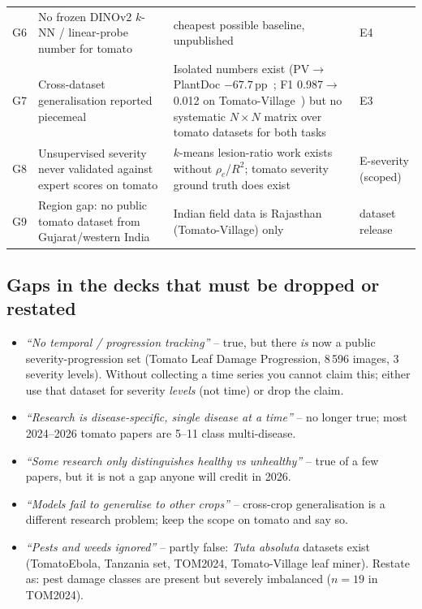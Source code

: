 \begin{longtable}{@{}L{0.6cm}L{4.7cm}L{6.4cm}L{4.2cm}@{}}
G6 & No frozen DINOv2 $k$-NN / linear-probe number for tomato & cheapest possible baseline, unpublished & E4 \\
G7 & Cross-dataset generalisation reported piecemeal & Isolated numbers exist (PV$\to$PlantDoc $-67.7$\,pp~\cite{fpls2026gap}; F1 0.987$\to$0.012 on Tomato-Village~\cite{biorxiv2024}) but no systematic $N\times N$ matrix over tomato datasets for both tasks & E3 \\
G8 & Unsupervised severity never validated against expert scores on tomato & $k$-means lesion-ratio work exists~\cite{charak2022} without $\rho_c$/$R^2$; tomato severity ground truth does exist~\cite{sad2015} & E-severity (scoped) \\
G9 & Region gap: no public tomato dataset from Gujarat/western India & Indian field data is Rajasthan (Tomato-Village) only & dataset release \\
\end{longtable}

\subsection{Gaps in the decks that must be dropped or restated}
\begin{itemize}
  \item \emph{``No temporal / progression tracking''} -- true, but there \emph{is} now a public severity-progression set (Tomato Leaf Damage Progression, 8\,596 images, 3 severity levels). Without collecting a time series you cannot claim this; either use that dataset for severity \emph{levels} (not time) or drop the claim.
  \item \emph{``Research is disease-specific, single disease at a time''} -- no longer true; most 2024--2026 tomato papers are 5--11 class multi-disease.
  \item \emph{``Some research only distinguishes healthy vs unhealthy''} -- true of a few papers, but it is not a gap anyone will credit in 2026.
  \item \emph{``Models fail to generalise to other crops''} -- cross-crop generalisation is a different research problem; keep the scope on tomato and say so.
  \item \emph{``Pests and weeds ignored''} -- partly false: \emph{Tuta absoluta} datasets exist (TomatoEbola, Tanzania set, TOM2024, Tomato-Village leaf miner). Restate as: pest damage classes are present but severely imbalanced ($n{=}19$ in TOM2024).
\end{itemize}

